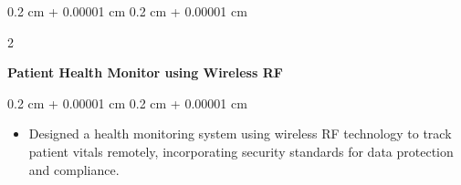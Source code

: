 \documentclass[10pt, letterpaper]{article}
\newenvironment{highlights}{
    \begin{itemize}[
        topsep=0.10 cm,
        parsep=0.10 cm,
        partopsep=0pt,
        itemsep=0pt,
        leftmargin=0.4 cm + 10pt
    ]
}{
    \end{itemize}
} %
\newenvironment{onecolentry}{
    \begin{adjustwidth}{
        0.2 cm + 0.00001 cm
    }{
        0.2 cm + 0.00001 cm
    }
}{
    \end{adjustwidth}
} %
\newenvironment{twocolentry}[2][]{
    \onecolentry
    \def\secondColumn{#2}
    \setcolumnwidth{\fill, 4.5 cm}
    \begin{paracol}{2}
}{
    \switchcolumn \raggedleft \secondColumn
    \end{paracol}
    \endonecolentry
} %
\begin{document}
    \vspace{0.2 cm}
    \begin{twocolentry}{}
        \textbf{Patient Health Monitor using Wireless RF}
    \end{twocolentry}
    \vspace{0.10 cm}
    \begin{onecolentry}
        \begin{highlights}
            \item Designed a health monitoring system using wireless RF technology to track patient vitals remotely, incorporating security standards for data protection and compliance.
        \end{highlights}
    \end{onecolentry}
\end{document}
